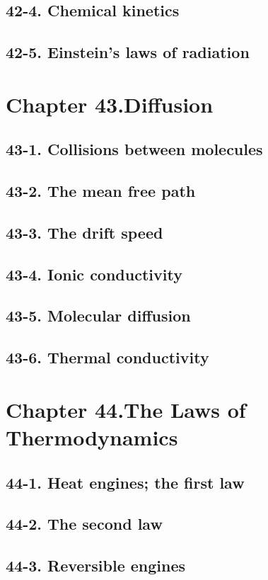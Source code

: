 \documentclass{article}
\begin{document}
\subsection{42-4. Chemical kinetics}
\subsection{42-5. Einstein’s laws of radiation}
\section{Chapter 43.Diffusion}
\subsection{43-1. Collisions between molecules}
\subsection{43-2. The mean free path}
\subsection{43-3. The drift speed}
\subsection{43-4. Ionic conductivity}
\subsection{43-5. Molecular diffusion}
\subsection{43-6. Thermal conductivity}
\section{Chapter 44.The Laws of Thermodynamics}
\subsection{44-1. Heat engines; the first law}
\subsection{44-2. The second law}
\subsection{44-3. Reversible engines}
\end{document}
